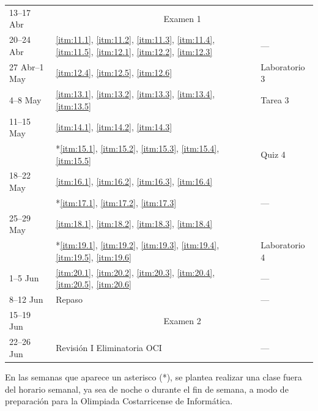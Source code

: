 \begin{longtable}{p{3.2cm}p{6.6cm}p{2.8cm}}
\rowcolor{yellow!20}
13--17 Abr &
\multicolumn{2}{c}{Examen 1}
\\
\addlinespace

20--24 Abr &
\ref{itm:11.1}, \ref{itm:11.2}, \ref{itm:11.3}, \ref{itm:11.4}, \ref{itm:11.5},
\ref{itm:12.1}, \ref{itm:12.2}, \ref{itm:12.3}
&
---
\\
\addlinespace

27 Abr--1 May &
\ref{itm:12.4}, \ref{itm:12.5}, \ref{itm:12.6}
&
Laboratorio 3
\\
\addlinespace

4--8 May &
\ref{itm:13.1}, \ref{itm:13.2}, \ref{itm:13.3}, \ref{itm:13.4}, \ref{itm:13.5}
&
Tarea 3
\\
\addlinespace

11--15 May &
\ref{itm:14.1}, \ref{itm:14.2}, \ref{itm:14.3} \\
& *\ref{itm:15.1}, \ref{itm:15.2}, \ref{itm:15.3}, \ref{itm:15.4}, \ref{itm:15.5}
&
Quiz 4
\\
\addlinespace

18--22 May &
\ref{itm:16.1}, \ref{itm:16.2}, \ref{itm:16.3}, \ref{itm:16.4} \\
& *\ref{itm:17.1}, \ref{itm:17.2}, \ref{itm:17.3}
&
---
\\
\addlinespace

25--29 May &
\ref{itm:18.1}, \ref{itm:18.2}, \ref{itm:18.3}, \ref{itm:18.4} \\
& *\ref{itm:19.1}, \ref{itm:19.2}, \ref{itm:19.3}, \ref{itm:19.4}, \ref{itm:19.5}, \ref{itm:19.6}
&
Laboratorio 4
\\
\addlinespace

1--5 Jun &
\ref{itm:20.1}, \ref{itm:20.2}, \ref{itm:20.3}, \ref{itm:20.4}, \ref{itm:20.5}, \ref{itm:20.6}
&
---
\\
\addlinespace

8--12 Jun &
Repaso
&
---
\\
\addlinespace

\rowcolor{yellow!20}
15--19 Jun &
\multicolumn{2}{c}{Examen 2}
\\
\addlinespace

22--26 Jun &
Revisión I Eliminatoria OCI
&
---
\\
\end{longtable}

En las semanas que aparece un asterisco (*), se plantea realizar una clase fuera del horario semanal, ya sea de noche o durante el fin de semana, a modo de preparación para la Olimpiada Costarricense de Informática.
